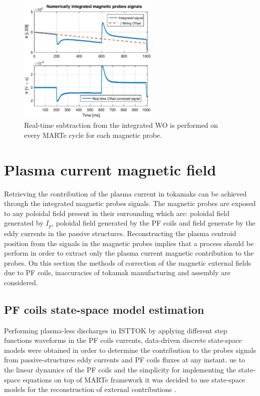\begin{figure}[htbp]
	\centering
	\includegraphics[width=0.6\textwidth]{Chp4/offset_remov_1}
	\caption{\label{offset_remove} Real-time subtraction from the integrated WO is performed on every MARTe cycle for each magnetic probe.  }
\end{figure}

%


\section{Plasma current magnetic field }

Retrieving the contribution of the plasma current in tokamaks can be achieved through the integrated magnetic probes signals. The magnetic probes are exposed to any poloidal field present in their surrounding which are: poloidal field generated by $I_p$, poloidal field generated by the PF coils and field generate by the eddy currents in the passive structures. Reconstructing the plasma centroid position from the signals in the magnetic probes implies that a process should be perform in order to extract only the plasma current magnetic contribution to the probes.  On this section the methods of correction of the magnetic external fields due to PF coils, inaccuracies of tokamak manufacturing and assembly are considered. \smallskip


\subsection{PF coils state-space model estimation}
Performing plasma-less discharges in ISTTOK by applying different step functions waveforms in the PF coils currents,  data-driven discrete state-space models were obtained in order to determine the contribution to the probes signals from passive-structures eddy currents and PF coils fluxes at any instant. ue to the linear dynamics of the PF coils and the simplicity for implementing the state-space equations on top of MARTe framework it was decided to use state-space models for the reconstruction of external contributions \cite[Chapter~2]{Chen1999}.\smallskip

